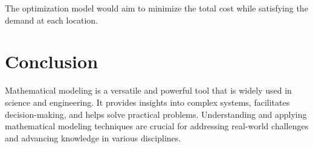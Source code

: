 \documentclass{article}
\begin{document}
The optimization model would aim to minimize the total cost while satisfying the demand at each location.

\section{Conclusion}

Mathematical modeling is a versatile and powerful tool that is widely used in science and engineering. It provides insights into complex systems, facilitates decision-making, and helps solve practical problems. Understanding and applying mathematical modeling techniques are crucial for addressing real-world challenges and advancing knowledge in various disciplines.
\end{document}

